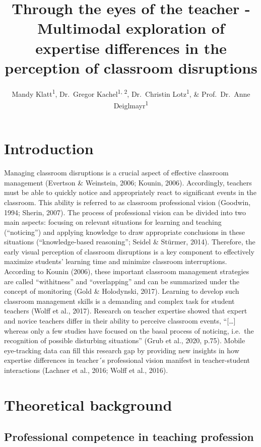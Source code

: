 \documentclass[
  man]{apa6}
\title{Through the eyes of the teacher - Multimodal exploration of expertise differences in the perception of classroom disruptions}
\author{Mandy Klatt\textsuperscript{1}, Dr.~Gregor Kachel\textsuperscript{1, 2}, Dr.~Christin Lotz\textsuperscript{1}, \& Prof.~Dr.~Anne Deiglmayr\textsuperscript{1}}
\date{}
\affiliation{\vspace{0.5cm}\textsuperscript{1} Leipzig University\\\textsuperscript{2} Max Planck Institute for Evolutionary Anthropology}
\begin{document}
\maketitle

\hypertarget{introduction}{%
\section{Introduction}\label{introduction}}

Managing classroom disruptions is a crucial aspect of effective classroom management (Evertson \& Weinstein, 2006; Kounin, 2006). Accordingly, teachers must be able to quickly notice and appropriately react to significant events in the classroom. This ability is referred to as classroom professional vision (Goodwin, 1994; Sherin, 2007). The process of professional vision can be divided into two main aspects: focusing on relevant situations for learning and teaching (``noticing'') and applying knowledge to draw appropriate conclusions in these situations (``knowledge-based reasoning''; Seidel \& Stürmer, 2014). Therefore, the early visual perception of classroom disruptions is a key component to effectively maximize students' learning time and minimize classroom interruptions. According to Kounin (2006), these important classroom management strategies are called ``withitness'' and ``overlapping'' and can be summarized under the concept of monitoring (Gold \& Holodynski, 2017). Learning to develop such classroom management skills is a demanding and complex task for student teachers (Wolff et al., 2017). Research on teacher expertise showed that expert and novice teachers differ in their ability to perceive classroom events, ``{[}\ldots{]} whereas only a few studies have focused on the basal process of noticing, i.e.~the recognition of possible disturbing situations'' (Grub et al., 2020, p.75). Mobile eye-tracking data can fill this research gap by providing new insights in how expertise differences in teacher´s professional vision manifest in teacher-student interactions (Lachner et al., 2016; Wolff et al., 2016).

\hypertarget{theoretical-background}{%
\section{Theoretical background}\label{theoretical-background}}

\hypertarget{professional-competence-in-teaching-profession}{%
\subsection{Professional competence in teaching profession}\label{professional-competence-in-teaching-profession}}
\end{document}
